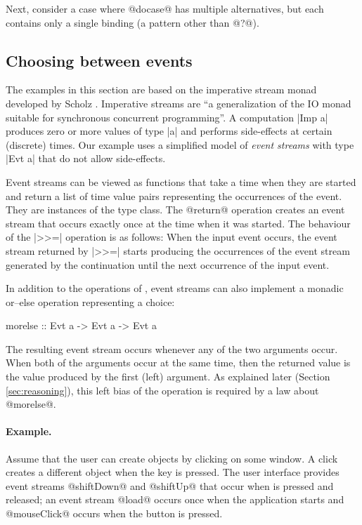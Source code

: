\documentclass[preprint]{sigplanconf}
\begin{document}
Next, consider a case where @docase@ has multiple alternatives, but each contains only a single
binding (a pattern other than @?@).


\subsection{Choosing between events}
\label{sec:intro-choosing-events}

The examples in this section are based on the imperative stream monad developed by Scholz
\cite{imperative-streams}. Imperative streams are ``a generalization of the IO monad suitable for
synchronous concurrent programming''. A computation |Imp a| produces zero or more
values of type |a| and performs side-effects at certain (discrete) times. Our example uses 
a simplified model of \textit{event streams} with type |Evt a| that do not allow side-effects.

Event streams can be viewed as functions that take a time when they are started and return a list of 
time value pairs representing the occurrences of the event. They are instances of the  
type class. The @return@ operation creates an event stream that occurs exactly once at the time when 
it was started. The behaviour of the |>>=| operation is as follows: When the input event occurs, the 
event stream returned by |>>=| starts producing the occurrences of the event stream generated by the 
continuation until the next occurrence of the input event.

In addition to the operations of , event streams can also implement a monadic or--else
operation representing a choice:

\begin{code}
morelse :: Evt a -> Evt a -> Evt a
\end{code}
The resulting event stream occurs whenever any of the two arguments occur. When both of the 
arguments occur at the same time, then the returned value is the value produced by the first (left)
argument. As explained later (Section \ref{sec:reasoning}), this left bias of the operation is 
required by a law about @morelse@.

\paragraph{Example.} Assume that the user can create objects by clicking on some window. A click 
creates a different object when the  key is pressed. The user interface provides event 
streams @shiftDown@ and @shiftUp@ that occur when  is pressed and released; an event 
stream @load@ occurs once when the application starts and @mouseClick@ occurs when the button is pressed.
\end{document}

